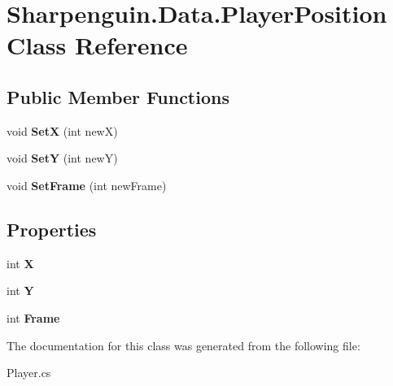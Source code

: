 \hypertarget{classSharpenguin_1_1Data_1_1PlayerPosition}{\section{\-Sharpenguin.\-Data.\-Player\-Position \-Class \-Reference}
\label{classSharpenguin_1_1Data_1_1PlayerPosition}
}
\subsection*{\-Public \-Member \-Functions}
\begin{DoxyCompactItemize}
\item 
\hypertarget{classSharpenguin_1_1Data_1_1PlayerPosition_ac832059f9588cb1555f77932a83f1e28}{void {\bfseries \-Set\-X} (int new\-X)}\label{classSharpenguin_1_1Data_1_1PlayerPosition_ac832059f9588cb1555f77932a83f1e28}

\item 
\hypertarget{classSharpenguin_1_1Data_1_1PlayerPosition_ac0fc1367c7719819e96c546c3b7c03ad}{void {\bfseries \-Set\-Y} (int new\-Y)}\label{classSharpenguin_1_1Data_1_1PlayerPosition_ac0fc1367c7719819e96c546c3b7c03ad}

\item 
\hypertarget{classSharpenguin_1_1Data_1_1PlayerPosition_ab933e7d66a3fd4b4995976435e83d3db}{void {\bfseries \-Set\-Frame} (int new\-Frame)}\label{classSharpenguin_1_1Data_1_1PlayerPosition_ab933e7d66a3fd4b4995976435e83d3db}

\end{DoxyCompactItemize}
\subsection*{\-Properties}
\begin{DoxyCompactItemize}
\item 
\hypertarget{classSharpenguin_1_1Data_1_1PlayerPosition_a11bbf80a101eae8babe8318393774484}{int {\bfseries \-X}}\label{classSharpenguin_1_1Data_1_1PlayerPosition_a11bbf80a101eae8babe8318393774484}

\item 
\hypertarget{classSharpenguin_1_1Data_1_1PlayerPosition_a4c818eaad71aa238fd97ad406b46c69c}{int {\bfseries \-Y}}\label{classSharpenguin_1_1Data_1_1PlayerPosition_a4c818eaad71aa238fd97ad406b46c69c}

\item 
\hypertarget{classSharpenguin_1_1Data_1_1PlayerPosition_a555140f271a845cd29a97d86ce2abfb8}{int {\bfseries \-Frame}}\label{classSharpenguin_1_1Data_1_1PlayerPosition_a555140f271a845cd29a97d86ce2abfb8}

\end{DoxyCompactItemize}


\-The documentation for this class was generated from the following file\-:\begin{DoxyCompactItemize}
\item 
\-Player.\-cs\end{DoxyCompactItemize}
